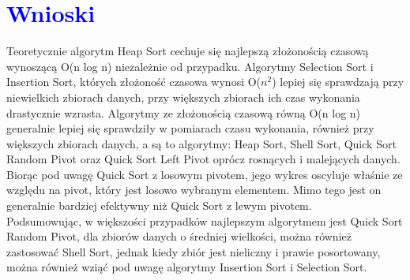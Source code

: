\documentclass{article}
\begin{document}
\begin{figure}[H]
{
		}
	\end{figure}
	\section*{\textcolor{blue}{Wnioski}}
	Teoretycznie algorytm Heap Sort cechuje się najlepszą złożonością czasową wynoszącą O(n log n) niezależnie od przypadku. Algorytmy Selection Sort i Insertion Sort, których złożoność czasowa wynosi O($n^2$) lepiej się sprawdzają przy niewielkich zbiorach danych, przy większych zbiorach ich czas wykonania drastycznie wzrasta. Algorytmy ze złożonością czasową równą O(n log n) generalnie lepiej się sprawdziły w pomiarach czasu wykonania, również przy większych zbiorach danych, a są to algorytmy: Heap Sort, Shell Sort, Quick Sort Random Pivot oraz Quick Sort Left Pivot oprócz rosnących i malejących danych. Biorąc pod uwagę Quick Sort z losowym pivotem, jego wykres oscyluje właśnie ze względu na pivot, który jest losowo wybranym elementem. Mimo tego jest on generalnie bardziej efektywny niż Quick Sort z lewym pivotem. \\Podsumowując, w większości przypadków najlepszym algorytmem jest Quick Sort Random Pivot, dla zbiorów danych o średniej wielkości, można również zastosować Shell Sort, jednak kiedy zbiór jest nieliczny i prawie posortowany, można również wziąć pod uwagę algorytmy Insertion Sort i Selection Sort.
	
	
\end{document}
